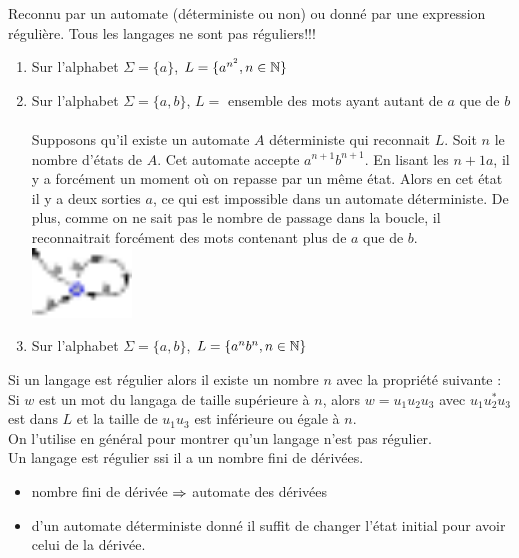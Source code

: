  Reconnu par un automate (déterministe ou non) ou donné par une expression régulière. Tous les langages ne sont pas réguliers!!! \\

\begin{enumerate}
	\item Sur l'alphabet $\Sigma = \{ a \}$, $L = \{ a^{n^2},n\in\mathbb{N} \}$
	\item Sur l'alphabet $\Sigma = \{ a,b\}$, $L =$ ensemble des mots ayant autant de $a$ que de $b$\\
	 \\
	Supposons qu'il existe un automate $A$ déterministe qui reconnait $L$. Soit $n$ le nombre d'états de $A$. Cet automate accepte $a^{n+1}b^{n+1}$. En lisant les $n + 1 a$, il y a forcément un moment où on repasse par un même état. Alors en cet état il y a deux sorties $a$, ce qui est impossible dans un automate déterministe. De plus, comme on ne sait pas le nombre de passage dans la boucle, il reconnaitrait forcément des mots contenant plus de $a$ que de $b$.\\
	\includegraphics[width=100px]{Images/fig3.pdf}
	\item Sur l'alphabet $\Sigma = \{ a,b\}$, $L =\{a^nb^n, n\in \mathbb{N}\}$
\end{enumerate}
\newpage
{} Si un langage est régulier alors il existe un nombre $n$ avec la propriété suivante : Si $w$ est un mot du langaga de taille supérieure à $n$, alors $w=u_1u_2u_3$ avec $u_1u_2^*u_3$ est dans $L$ et la taille de $u_1u_3$ est inférieure ou égale à $n$. \\

 On l'utilise en général pour montrer qu'un langage n'est pas régulier.\\

 Un langage est régulier ssi il a un nombre fini de dérivées.\\

\begin{itemize}
	\item nombre fini de dérivée $\Rightarrow$ automate des dérivées
	\item d'un automate déterministe donné il suffit de changer l'état initial pour avoir celui de la dérivée.
\end{itemize}
